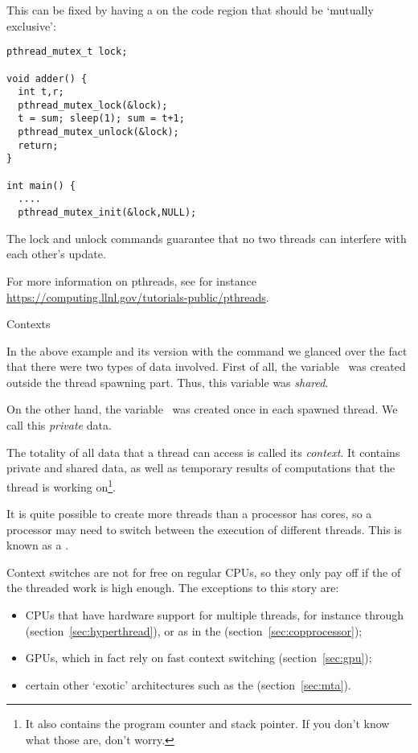 This can be fixed by having a  on the code region that should be
`mutually exclusive':
\begin{verbatim}
pthread_mutex_t lock;

void adder() {
  int t,r;
  pthread_mutex_lock(&lock);
  t = sum; sleep(1); sum = t+1; 
  pthread_mutex_unlock(&lock);
  return;
}

int main() {
  ....
  pthread_mutex_init(&lock,NULL);

\end{verbatim}
The lock and unlock commands guarantee that no two threads can
interfere with each other's update.

For more information on pthreads, see for instance
\url{https://computing.llnl.gov/tutorials-public/pthreads}.


 {Contexts}
\label{sec:context}

In the above example and its version with the  command
we glanced over the fact that there were two types of data involved.
First of all, the variable~ was created outside the thread spawning
part. Thus, this variable was \emph{shared}.

On the other hand, the variable~ was created once in each spawned thread.
We call this \emph{private} data.

The totality of all data that a thread can access is called
its \emph{context}.  It contains private and shared data, as well as
temporary results of computations that the thread is working
on\footnote{It also contains the program counter and stack pointer. If
you don't know what those are, don't worry.}.

It is quite possible to create more threads than a processor has cores,
so a processor may need to switch between the execution of different threads.
This is known as a .

Context switches are not for free on regular CPUs, so they only pay off
if the  of the threaded work is high enough.
The exceptions to this story are:
\begin{itemize}
\item CPUs that have hardware support for multiple threads, for
  instance through 
  (section~\ref{sec:hyperthread}), or as in the
   (section~\ref{sec:copprocessor});
\item \acp{GPU}, which in fact rely on fast context switching (section~\ref{sec:gpu});
\item certain other `exotic' architectures such as the 
  (section~\ref{sec:mta}).
\end{itemize}

